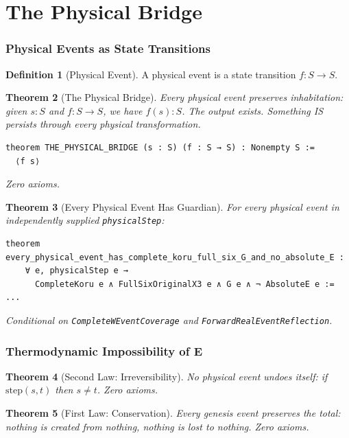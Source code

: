 \documentclass[11pt,a4paper]{article}
\newtheorem{theorem}{Theorem}[section]
\theoremstyle{definition}
\newtheorem{definition}[theorem]{Definition}
\theoremstyle{remark}
\begin{document}
\part{The Physical Bridge}

\section{Physical Events as State Transitions}
\label{sec:physical-bridge}

\begin{definition}[Physical Event]
A physical event is a state transition $f : S \to S$.
\end{definition}

\begin{theorem}[The Physical Bridge]
Every physical event preserves inhabitation: given $s : S$ and $f : S \to S$, we have $f(s) : S$. The output exists. Something IS persists through every physical transformation.
\begin{lstlisting}
theorem THE_PHYSICAL_BRIDGE (s : S) (f : S → S) : Nonempty S :=
  ⟨f s⟩
\end{lstlisting}
Zero axioms.
\end{theorem}

\begin{theorem}[Every Physical Event Has Guardian]
For every physical event in independently supplied \texttt{physicalStep}:
\begin{lstlisting}
theorem every_physical_event_has_complete_koru_full_six_G_and_no_absolute_E :
    ∀ e, physicalStep e →
      CompleteKoru e ∧ FullSixOriginalX3 e ∧ G e ∧ ¬ AbsoluteE e := ...
\end{lstlisting}
Conditional on \texttt{CompleteWEventCoverage} and \texttt{ForwardRealEventReflection}.
\end{theorem}

\section{Thermodynamic Impossibility of E}
\label{sec:thermodynamics}

\begin{theorem}[Second Law: Irreversibility]
No physical event undoes itself: if $\text{step}(s, t)$ then $s \ne t$. Zero axioms.
\end{theorem}

\begin{theorem}[First Law: Conservation]
Every genesis event preserves the total: nothing is created from nothing, nothing is lost to nothing. Zero axioms.
\end{theorem}
\end{document}
